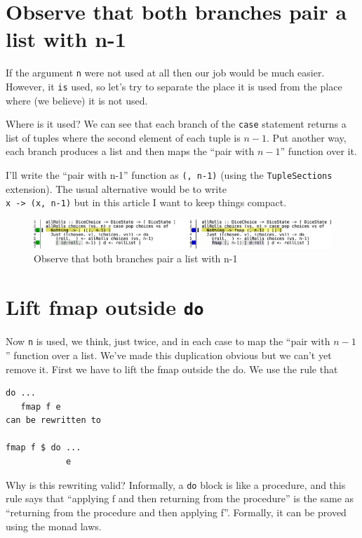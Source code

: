 \section{Observe that both branches pair a list with n-1}


If the argument \texttt{n} were not used at all then our job would be much easier. However, it \texttt{is} used, so let's try to separate the place it is used from the place where (we believe) it is not used.

Where is it used? We can see that each branch of the \texttt{case} statement returns a list of tuples where the second element of each tuple is $n-1$. Put another way, each branch produces a list and then maps the ``pair with $n-1$'' function over it.

I'll write the ``pair with n-1'' function as \verb|(, n-1)| (using the \texttt{TupleSections} extension). The usual alternative would be to write \texttt{\\x -> (x, n-1)} but in this article I want to keep things compact.

\begin{figure}[htbp]
 \centering
 \includegraphics[width=\linewidth]{./pics/diff18.pdf}
 \caption{Observe that both branches pair a list with n-1}
 \label{fig:diff18}
\end{figure}


\section{Lift fmap outside \texttt{do}}


Now \texttt{n} is used, we think, just twice, and in each case to map the ``pair with $n-1$'' function over a list. We've made this duplication obvious but we can't yet remove it. First we have to lift the fmap outside the do. We use the rule that

\begin{verbatim}
do ...
   fmap f e
can be rewritten to

fmap f $ do ...
            e
\end{verbatim}
Why is this rewriting valid? Informally, a \texttt{do} block is like a procedure, and this rule says that ``applying f and then returning from the procedure'' is the same as ``returning from the procedure and then applying f''. Formally, it can be proved using the monad laws.

